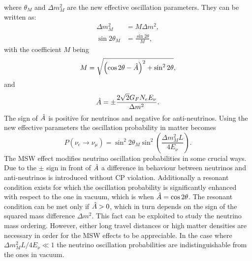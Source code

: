 where $\theta_M$ and $\Delta m_M^2$ are the new effective oscillation parameters. They can be written as:
\begin{equation}
    \begin{aligned}
        \Delta m^2_M & = M \Delta m^2 ,\\
        \sin 2 \theta_M & = \frac{\sin 2 \theta}{M} , 
    \end{aligned}
\end{equation}
with the coefficient $M$ being 
\begin{equation}
    M = \sqrt{\left(\cos 2\theta - \Hat{A}\right)^2 + \sin^2 2 \theta} ,
\end{equation}
and 
\begin{equation}
    \Hat{A} = \pm \frac{2\sqrt{2}G_F N_e E_\nu}{\Delta m^2} .
\end{equation}
The sign of $\Hat{A}$ is positive for neutrinos and negative for anti-neutrinos. Using the new effective parameters the oscillation probability in matter becomes
\begin{equation}
    P(\nu_e \rightarrow \nu_\mu) = \sin^2 2 \theta_M \sin^2 \left(\frac{\Delta m^2_M L}{4 E_\nu}\right) .
\end{equation}
The MSW effect modifies neutrino oscillation probabilities in some crucial ways. Due to the $\pm$ sign in front of $\Hat{A}$ a difference in behaviour between neutrinos and anti-neutrinos is introduced without CP violation. Additionally a resonant condition exists for which the oscillation probability is significantly enhanced with respect to the one in vacuum, which is when $\Hat{A}= \cos 2 \theta$. The resonant condition can be met only if $\Hat{A}>0$, which in turn depends on the sign of the squared mass difference $\Delta m^2$. This fact can be exploited to study the neutrino mass ordering. However, either long travel distances or high matter densities are necessary in order for the MSW effects to be appreciable. In the case where $\Delta m_M^2 L /4 E_\nu \ll 1$ the neutrino oscillation probabilities are indistinguishable from the ones in vacuum.


